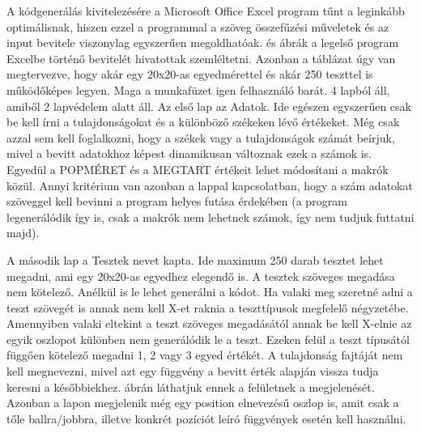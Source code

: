 \documentclass[12ppt,a4paper,oneside]{report}
\begin{document}
    
    {A kódgenerálás kivitelezésére a Microsoft Office Excel program tűnt a leginkább optimálisnak, hiszen ezzel a programmal a szöveg összefűzési műveletek és az input bevitele viszonylag egyszerűen megoldhatóak.  és  ábrák a legelső program Excelbe történő bevitelét hivatottak szemléltetni. Azonban a táblázat úgy van megtervezve, hogy akár egy 20x20-as egyedmérettel és akár 250 teszttel is működőképes legyen. Maga a munkafüzet igen felhasználó barát. 4 lapból áll, amiből 2 lapvédelem alatt áll.}
    {Az első lap az Adatok. Ide egészen egyszerűen csak be kell írni a tulajdonságokat és a különböző székeken lévő értékeket. Még csak azzal sem kell foglalkozni, hogy a székek vagy a tulajdonságok számát beírjuk, mivel a bevitt adatokhoz képest dinamikusan változnak ezek a számok is. Egyedül a POPMÉRET és a MEGTART értékeit lehet módosítani a makrók közül. Annyi kritérium van azonban a lappal kapcsolatban, hogy a szám adatokat szöveggel kell bevinni a program helyes futása érdekében (a program legenerálódik így is, csak a makrók nem lehetnek számok, így nem tudjuk futtatni majd).}
    
      
    {A második lap a Tesztek nevet kapta. Ide maximum 250 darab tesztet lehet megadni, ami egy 20x20-as egyedhez elegendő is. A tesztek szöveges megadása nem kötelező. Anélkül is le lehet generálni a kódot. Ha valaki meg szeretné adni a teszt szövegét is annak nem kell X-et raknia a teszttípusok megfelelő négyzetébe. Amennyiben valaki eltekint a teszt szöveges megadásától annak be kell X-elnie az egyik oszlopot különben nem generálódik le a teszt. Ezeken felül a teszt típusától függően kötelező megadni 1, 2 vagy 3 egyed értékét. A tulajdonság fajtáját nem kell megnevezni, mivel azt egy függvény a bevitt érték alapján vissza tudja keresni a későbbiekhez.  ábrán láthatjuk ennek a felületnek a megjelenését. Azonban a lapon megjelenik még egy position elnevezésű oszlop is, amit csak a tőle ballra/jobbra, illetve konkrét pozíciót leíró függvények esetén kell használni.}
    
\end{document}

